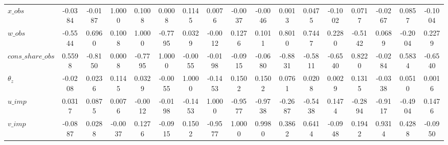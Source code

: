 \begin{center}
\begin{longtable}{lcccccccccccccccc}
$x\_obs             $	 & 	              -0.0384	 & 	              -0.0187	 & 	               1.0000	 & 	               0.1008	 & 	               0.0008	 & 	               0.1145	 & 	               0.0076	 & 	              -0.0037	 & 	              -0.0046	 & 	               0.0013	 & 	               0.0475	 & 	              -0.1002	 & 	               0.0717	 & 	              -0.0267	 & 	               0.0857	 & 	              -0.1004 \\ 
$w\_obs             $	 & 	              -0.5544	 & 	               0.6960	 & 	               0.1008	 & 	               1.0000	 & 	              -0.7795	 & 	               0.0329	 & 	              -0.0012	 & 	               0.1276	 & 	               0.1011	 & 	               0.8010	 & 	               0.7447	 & 	               0.2280	 & 	              -0.5142	 & 	               0.0689	 & 	              -0.2004	 & 	               0.2279 \\ 
$cons\_share\_obs   $	 & 	               0.5598	 & 	              -0.8150	 & 	               0.0008	 & 	              -0.7795	 & 	               1.0000	 & 	              -0.0055	 & 	              -0.0198	 & 	              -0.0915	 & 	              -0.0680	 & 	              -0.8831	 & 	              -0.5811	 & 	              -0.6540	 & 	               0.8220	 & 	              -0.0284	 & 	               0.5834	 & 	              -0.6540 \\ 
${\theta_z}         $	 & 	              -0.0208	 & 	               0.0236	 & 	               0.1145	 & 	               0.0329	 & 	              -0.0055	 & 	               1.0000	 & 	              -0.1453	 & 	               0.1502	 & 	               0.1502	 & 	               0.0761	 & 	               0.0208	 & 	               0.0029	 & 	               0.1315	 & 	              -0.0338	 & 	               0.0510	 & 	               0.0016 \\ 
$u\_imp             $	 & 	               0.0317	 & 	               0.0875	 & 	               0.0076	 & 	              -0.0012	 & 	              -0.0198	 & 	              -0.1453	 & 	               1.0000	 & 	              -0.9577	 & 	              -0.9738	 & 	              -0.2687	 & 	              -0.5438	 & 	               0.1474	 & 	              -0.2894	 & 	              -0.9117	 & 	              -0.4904	 & 	               0.1476 \\ 
$v\_imp             $	 & 	              -0.0887	 & 	               0.0288	 & 	              -0.0037	 & 	               0.1276	 & 	              -0.0915	 & 	               0.1502	 & 	              -0.9577	 & 	               1.0000	 & 	               0.9980	 & 	               0.3862	 & 	               0.6414	 & 	              -0.0948	 & 	               0.1942	 & 	               0.9314	 & 	               0.4288	 & 	              -0.0950 \\ 

\end{longtable}
\end{center}
